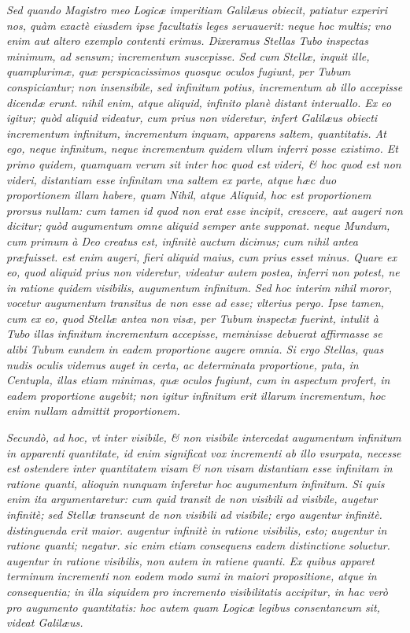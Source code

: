 \documentclass[11pt,twoside,openany]{book}
\begin{document}
\par\bigskip\noindent{}\enspace \textit{Sed quando Magistro meo Logicæ imperitiam Galilæus obiecit, patiatur experiri nos, quàm exactè eiusdem ipse facultatis leges seruauerit: neque hoc multis; vno enim aut altero exemplo contenti erimus. Dixeramus Stellas Tubo inspectas minimum, ad sensum; incrementum suscepisse. Sed cum Stellæ, inquit ille, quamplurimæ, quæ perspicacissimos quosque oculos fugiunt, per Tubum conspiciantur; non insensibile, sed infinitum potius, incrementum ab illo accepisse dicendæ erunt. nihil enim, atque aliquid, infinito planè distant interuallo. Ex eo igitur; quòd aliquid videatur, cum prius non videretur, infert Galilæus obiecti incrementum infinitum, incrementum inquam, apparens saltem, quantitatis. At ego, neque infinitum, neque incre}\textit{mentum quidem vllum inferri posse existimo. Et primo quidem, quamquam verum sit inter hoc quod est videri, \& hoc quod est non videri, distantiam esse infinitam vna saltem ex parte, atque hæc duo proportionem illam habere, quam Nihil, atque Aliquid, hoc est proportionem prorsus nullam: cum tamen id quod non erat esse incipit, crescere, aut augeri non dicitur; quòd augumentum omne aliquid semper ante supponat. neque Mundum, cum primum à Deo creatus est, infinitè auctum dicimus; cum nihil antea præfuisset. est enim augeri, fieri aliquid maius, cum prius esset minus. Quare ex eo, quod aliquid prius non videretur, videatur autem postea, inferri }\textit{non potest, ne in ratione quidem visibilis, augumentum infinitum. Sed hoc interim nihil moror, vocetur augumentum transitus de non esse ad esse; vlterius pergo. Ipse tamen, cum ex eo, quod Stellæ antea non visæ, per Tubum inspectæ fuerint, intulit à Tubo illas infinitum incrementum accepisse, meminisse debuerat affirmasse se alibi Tubum eundem in eadem proportione augere omnia. Si ergo Stellas, quas nudis oculis videmus auget in certa, ac determinata proportione, puta, in Centupla, illas etiam minimas, quæ oculos fugiunt, cum in aspectum profert, in eadem proportione augebit; non igitur infinitum erit illarum incrementum, hoc enim nullam admittit proportionem.}


\textit{Secundò, ad hoc, vt inter visibile, \& non visibile intercedat augumentum infinitum in apparenti quantitate, id enim significat vox incrementi ab illo vsurpata, necesse est ostendere inter quantitatem visam \& non visam distantiam esse infinitam in ratione quanti, alioquin nunquam inferetur hoc augumentum infinitum. Si quis enim ita argumentaretur: cum quid transit de non visibili ad visibile, augetur infinitè; sed Stellæ transeunt de non visibili ad visibile; ergo augentur infinitè. distinguenda erit maior. augentur infinitè in ratione visibilis, esto; augentur in ratione quanti; negatur. sic enim etiam consequens eadem distinctione soluetur. augentur in ratione visibilis, non autem in ratiene quanti. Ex quibus apparet terminum incrementi non eodem modo sumi in maiori propositione, atque in consequentia; in illa siquidem pro incremento visibilitatis accipitur, in hac verò pro augumento quantitatis: hoc autem quam Logicæ legibus consentaneum sit, videat Galilæus.}
\end{document}
